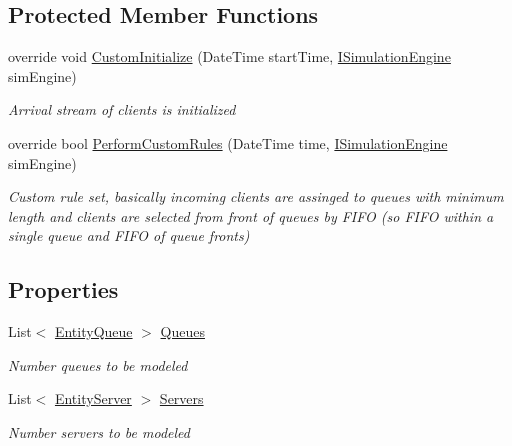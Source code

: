 \subsection*{Protected Member Functions}
\begin{DoxyCompactItemize}
\item 
override void \hyperlink{class_simple_queue_example_1_1_model_elements_1_1_control_unit_queuing_model_a89bbdcb2df864ca97f6469a6d821119b}{Custom\+Initialize} (Date\+Time start\+Time, \hyperlink{interface_simulation_core_1_1_simulation_classes_1_1_i_simulation_engine}{I\+Simulation\+Engine} sim\+Engine)
\begin{DoxyCompactList}\small\item\em Arrival stream of clients is initialized \end{DoxyCompactList}\item 
override bool \hyperlink{class_simple_queue_example_1_1_model_elements_1_1_control_unit_queuing_model_a45e1cb339b635e339653b56ca62870ea}{Perform\+Custom\+Rules} (Date\+Time time, \hyperlink{interface_simulation_core_1_1_simulation_classes_1_1_i_simulation_engine}{I\+Simulation\+Engine} sim\+Engine)
\begin{DoxyCompactList}\small\item\em Custom rule set, basically incoming clients are assinged to queues with minimum length and clients are selected from front of queues by F\+I\+FO (so F\+I\+FO within a single queue and F\+I\+FO of queue fronts) \end{DoxyCompactList}\end{DoxyCompactItemize}
\subsection*{Properties}
\begin{DoxyCompactItemize}
\item 
List$<$ \hyperlink{class_simple_queue_example_1_1_model_elements_1_1_entity_queue}{Entity\+Queue} $>$ \hyperlink{class_simple_queue_example_1_1_model_elements_1_1_control_unit_queuing_model_a299eaa9cc3197a30fd5480a3ff7d8724}{Queues}
\begin{DoxyCompactList}\small\item\em Number queues to be modeled \end{DoxyCompactList}\item 
List$<$ \hyperlink{class_simple_queue_example_1_1_model_elements_1_1_entity_server}{Entity\+Server} $>$ \hyperlink{class_simple_queue_example_1_1_model_elements_1_1_control_unit_queuing_model_a49ffeebb109f5d3b752479be15d1c1b7}{Servers}
\begin{DoxyCompactList}\small\item\em Number servers to be modeled \end{DoxyCompactList}\end{DoxyCompactItemize}
